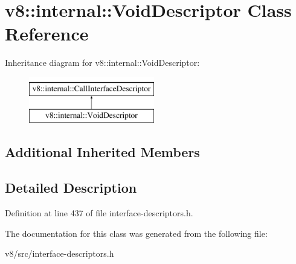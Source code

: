 \hypertarget{classv8_1_1internal_1_1VoidDescriptor}{}\section{v8\+:\+:internal\+:\+:Void\+Descriptor Class Reference}
\label{classv8_1_1internal_1_1VoidDescriptor}
Inheritance diagram for v8\+:\+:internal\+:\+:Void\+Descriptor\+:\begin{figure}[H]
\begin{center}
\leavevmode
\includegraphics[height=2.000000cm]{classv8_1_1internal_1_1VoidDescriptor}
\end{center}
\end{figure}
\subsection*{Additional Inherited Members}


\subsection{Detailed Description}


Definition at line 437 of file interface-\/descriptors.\+h.



The documentation for this class was generated from the following file\+:\begin{DoxyCompactItemize}
\item 
v8/src/interface-\/descriptors.\+h\end{DoxyCompactItemize}
